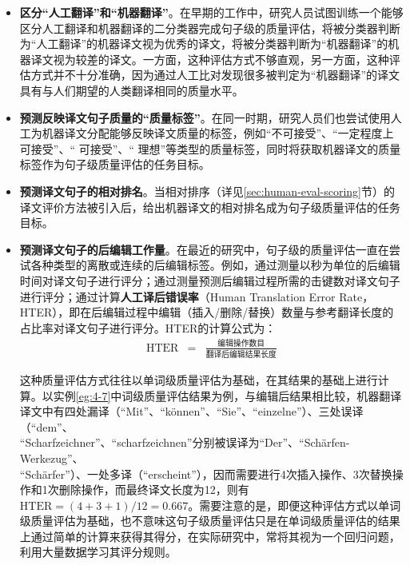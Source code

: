 \begin{itemize}
\vspace{0.5em}
\item {\small\sffamily\bfseries{区分“人工翻译”和“机器翻译”}}。在早期的工作中，研究人员试图训练一个能够区分人工翻译和机器翻译的二分类器完成句子级的质量评估，将被分类器判断为“人工翻译”的机器译文视为优秀的译文，将被分类器判断为“机器翻译”的机器译文视为较差的译文。一方面，这种评估方式不够直观，另一方面，这种评估方式并不十分准确，因为通过人工比对发现很多被判定为“机器翻译”的译文具有与人们期望的人类翻译相同的质量水平。
\vspace{0.5em}
\item {\small\sffamily\bfseries{预测反映译文句子质量的“质量标签”}}。在同一时期，研究人员们也尝试使用人工为机器译文分配能够反映译文质量的标签，例如“不可接受”、“一定程度上可接受”、“ 可接受”、“ 理想”等类型的质量标签，同时将获取机器译文的质量标签作为句子级质量评估的任务目标。
\vspace{0.5em}
\item {\small\sffamily\bfseries{预测译文句子的相对排名}}。当相对排序（详见\ref{sec:human-eval-scoring}节）的译文评价方法被引入后，给出机器译文的相对排名成为句子级质量评估的任务目标。
\vspace{0.5em}
\item {\small\sffamily\bfseries{预测译文句子的后编辑工作量}}。在最近的研究中，句子级的质量评估一直在尝试各种类型的离散或连续的后编辑标签。例如，通过测量以秒为单位的后编辑时间对译文句子进行评分；通过测量预测后编辑过程所需的击键数对译文句子进行评分；通过计算{\small\sffamily\bfseries{人工译后错误率}}（Human Translation Error Rate，HTER），即在后编辑过程中编辑（插入/删除/替换）数量与参考翻译长度的占比率对译文句子进行评分。HTER的计算公式为：
\vspace{0.5em}
\begin{eqnarray}
\textrm{HTER}&=& \frac{\mbox{编辑操作数目}}{\mbox{翻译后编辑结果长度}}
\label{eq:4-20}
\end{eqnarray}

\parinterval 这种质量评估方式往往以单词级质量评估为基础，在其结果的基础上进行计算。以实例\ref{eg:4-7}中词级质量评估结果为例，与编辑后结果相比较，机器翻译译文中有四处漏译（“Mit”、“können”、“Sie”、“einzelne”）、三处误译（“dem”、\\“Scharfzeichner”、“scharfzeichnen”分别被误译为“Der”、“Schärfen-Werkezug”、\\“Schärfer”）、一处多译（“erscheint”），因而需要进行4次插入操作、3次替换操作和1次删除操作，而最终译文长度为12，则有${\textrm {HTER}}=(4+3+1)/12=0.667$。需要注意的是，即便这种评估方式以单词级质量评估为基础，也不意味这句子级质量评估只是在单词级质量评估的结果上通过简单的计算来获得其得分，在实际研究中，常将其视为一个回归问题，利用大量数据学习其评分规则。
\vspace{0.5em}
\end{itemize}

